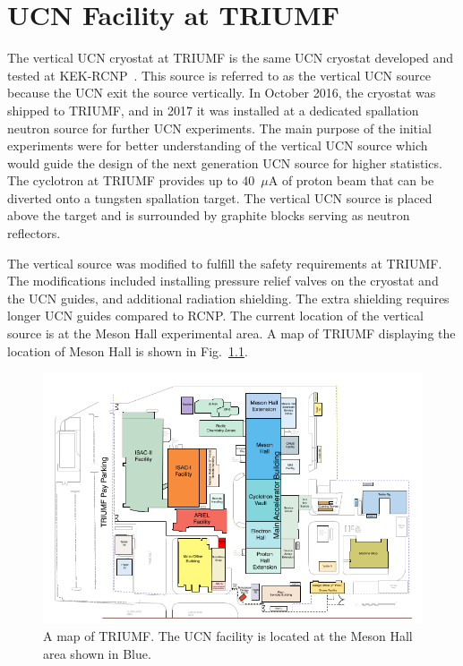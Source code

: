 \chapter{UCN Facility at TRIUMF\label{chap:UCNattriumf}}


The vertical UCN cryostat at TRIUMF is the same UCN cryostat developed
and tested at
KEK-RCNP~\cite{masuda2002spallation,masuda2012spallation}. This source
is referred to as the vertical UCN source because the UCN exit the
source vertically.  In October 2016, the cryostat was shipped to
TRIUMF, and in 2017 it was installed at a dedicated spallation neutron
source for further UCN experiments. The main purpose of the initial
experiments were for better understanding of the vertical UCN source
which would guide the design of the next generation UCN source for
higher statistics. The cyclotron at TRIUMF provides up to 40~$\mu$A of
proton beam that can be diverted onto a tungsten spallation
target. The vertical UCN source is placed above the target and is
surrounded by graphite blocks serving as neutron reflectors.


The vertical source was modified to fulfill the safety requirements at
TRIUMF. The modifications included installing pressure relief valves
on the cryostat and the UCN guides, and additional radiation
shielding. The extra shielding requires longer UCN guides compared to
RCNP. The current location of the vertical source is at the Meson Hall
experimental area. A map of TRIUMF displaying the location of Meson
Hall is shown in Fig.~\ref{fig:sitemap}.

\begin{figure}[h!]
  \centering
  \includegraphics[width=1.0\textwidth]{sitemap.png}
  \caption[A map of TRIUMF]{A map of TRIUMF. The UCN facility is
    located at the Meson Hall area shown in Blue.}
  \label{fig:sitemap}
\end{figure}

